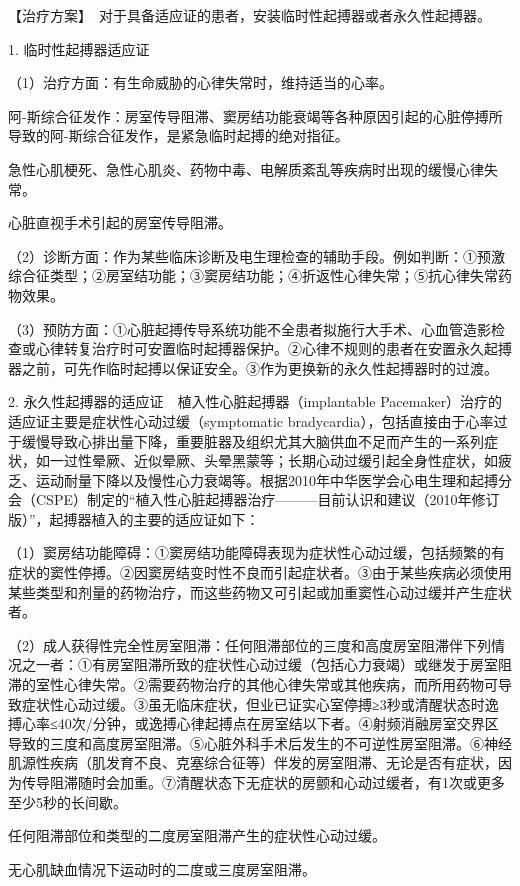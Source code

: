 【治疗方案】　对于具备适应证的患者，安装临时性起搏器或者永久性起搏器。

1. 临时性起搏器适应证

（1）治疗方面：有生命威胁的心律失常时，维持适当的心率。

阿-斯综合征发作：房室传导阻滞、窦房结功能衰竭等各种原因引起的心脏停搏所导致的阿-斯综合征发作，是紧急临时起搏的绝对指征。

急性心肌梗死、急性心肌炎、药物中毒、电解质紊乱等疾病时出现的缓慢心律失常。

心脏直视手术引起的房室传导阻滞。

（2）诊断方面：作为某些临床诊断及电生理检查的辅助手段。例如判断：①预激综合征类型；②房室结功能；③窦房结功能；④折返性心律失常；⑤抗心律失常药物效果。

（3）预防方面：①心脏起搏传导系统功能不全患者拟施行大手术、心血管造影检查或心律转复治疗时可安置临时起搏器保护。②心律不规则的患者在安置永久起搏器之前，可先作临时起搏以保证安全。③作为更换新的永久性起搏器时的过渡。

2. 永久性起搏器的适应证　植入性心脏起搏器（implantable
Pacemaker）治疗的适应证主要是症状性心动过缓（symptomatic
bradycardia），包括直接由于心率过于缓慢导致心排出量下降，重要脏器及组织尤其大脑供血不足而产生的一系列症状，如一过性晕厥、近似晕厥、头晕黑蒙等；长期心动过缓引起全身性症状，如疲乏、运动耐量下降以及慢性心力衰竭等。根据2010年中华医学会心电生理和起搏分会（CSPE）制定的“植入性心脏起搏器治疗---------目前认识和建议（2010年修订版）”，起搏器植入的主要的适应证如下：

（1）窦房结功能障碍：①窦房结功能障碍表现为症状性心动过缓，包括频繁的有症状的窦性停搏。②因窦房结变时性不良而引起症状者。③由于某些疾病必须使用某些类型和剂量的药物治疗，而这些药物又可引起或加重窦性心动过缓并产生症状者。

（2）成人获得性完全性房室阻滞：任何阻滞部位的三度和高度房室阻滞伴下列情况之一者：①有房室阻滞所致的症状性心动过缓（包括心力衰竭）或继发于房室阻滞的室性心律失常。②需要药物治疗的其他心律失常或其他疾病，而所用药物可导致症状性心动过缓。③虽无临床症状，但业已证实心室停搏≥3秒或清醒状态时逸搏心率≤40次/分钟，或逸搏心律起搏点在房室结以下者。④射频消融房室交界区导致的三度和高度房室阻滞。⑤心脏外科手术后发生的不可逆性房室阻滞。⑥神经肌源性疾病（肌发育不良、克塞综合征等）伴发的房室阻滞、无论是否有症状，因为传导阻滞随时会加重。⑦清醒状态下无症状的房颤和心动过缓者，有1次或更多至少5秒的长间歇。

任何阻滞部位和类型的二度房室阻滞产生的症状性心动过缓。

无心肌缺血情况下运动时的二度或三度房室阻滞。

